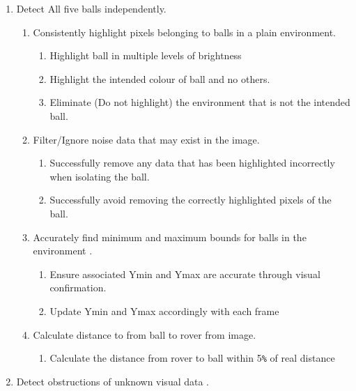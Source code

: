 \documentclass[10pt,twoside]{article}
\begin{document}
\begin{enumerate}
\itemsep0em
  \item Detect All five balls independently. 
        \begin{enumerate}
            \itemsep-0.2em
            \item Consistently highlight pixels belonging to balls in a plain environment.
                \begin{enumerate}
                    \itemsep-0.2em
                    \item Highlight ball in multiple levels of brightness
                    \item Highlight the intended colour of ball and no others.
                    \item Eliminate (Do not highlight) the environment that is not the intended ball.
                \end{enumerate}
            \item Filter/Ignore noise data that may exist in the image.
                \begin{enumerate}
                    \itemsep-0.2em
                    \item Successfully remove any data that has been highlighted incorrectly when isolating the ball. 
                    \item Successfully avoid removing the correctly highlighted pixels of the ball.
                \end{enumerate}
            \item Accurately find minimum and maximum bounds for balls in the environment .
                \begin{enumerate}
                    \itemsep-0.2em
                    \item Ensure associated Ymin and Ymax are accurate through visual confirmation. 
                    \item Update Ymin and Ymax accordingly with each frame 
                \end{enumerate}
            \item Calculate distance to from ball to rover from image. 
                \begin{enumerate}
                    \itemsep-0.2em
                    \item Calculate the distance from rover to ball within 5\verb|%| of real distance 
                \end{enumerate}
        \end{enumerate}
  \item Detect obstructions of unknown visual data .

\end{enumerate}
\end{document}
